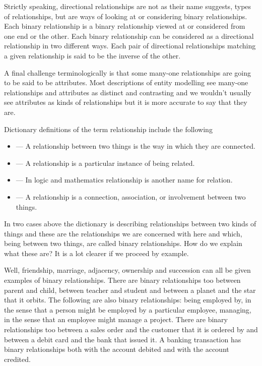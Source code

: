 \mynote Strictly speaking, directional relationships are not as their name suggests, types of relationships, but are ways of looking at or considering binary relationships. Each binary relationship is a binary relationship viewed at or considered from one end or the other. Each binary relationship can be considered as a directional relationship in two different ways. Each pair of directional relationships matching a given relationship is said to be the inverse of the other. 

\mynote
A final challenge terminologically is that some many-one relationships are going to be said to be attributes. Most descriptions of entity modelling see many-one relationships and attributes as distinct and contrasting and we wouldn't usually see attributes as kinds of relationships but it is more accurate to say that they are.
 
\mynote Dictionary definitions of the term relationship include the following
\begin{itemize}
\item --- A relationship between two things is the way in which they are connected.
\item --- A relationship is a particular instance of being related.
\item --- In logic and mathematics relationship is another name for relation.
\item --- A relationship is a connection, association, or involvement between two things.
\end{itemize}

\mynote In two cases above the dictionary is describing relationships between two kinds of things and these are the relationships we are concerned with here and which, being between two things, are called binary relationships. How do we explain what these are? It is a lot clearer if we proceed by example.

\mynote
Well, friendship,  marriage, adjacency, ownership and succession can all be given examples of binary relationships. There are binary relationships too  between parent and child, between teacher and student and between a planet and the star that it orbits.   
The following are also binary relationships:
being employed by, in the sense that a person might be employed by a particular employee,
managing, in the sense that an employee might manage a project. There are binary relationships too between a sales order and the customer that it is ordered by and between a debit card and  the bank that issued it. A banking transaction has binary relationships both with the account debited and with the account credited. 

